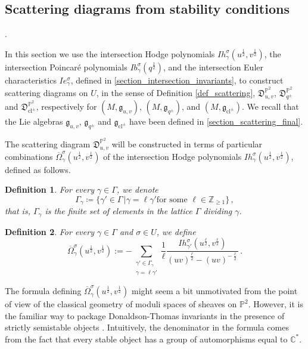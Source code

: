 \documentclass[12pt, a4paper]{amsart}
\newtheorem{defn}{Definition}[section]
\newcommand\C{\mathbb C}
\newcommand\PP{\mathbb P}
\newcommand\Z{\mathbb Z}
\newcommand\fD{\mathfrak D}
\newcommand\fg{\mathfrak g}
\newcommand\cl{\operatorname{cl}}
\begin{document}
\subsection{Scattering diagrams from stability conditions}.
\label{section_scattering_from_stability}

In this section we use the intersection Hodge polynomials 
$Ih_\gamma^\sigma(u^{\frac{1}{2}}, v^{\frac{1}{2}})$,
the intersection Poincar\'e polynomials $Ib_\gamma^\sigma(q^{\frac{1}{2}})$,
and the intersection Euler characteristics 
$Ie_\gamma^\sigma$, defined in  \cref{section_intersection_invariants},
to construct scattering diagrams on $U$, in the sense of 
Definition \ref{def_scattering}, $\fD^{\PP^2}_{u,v}$,
$\fD^{\PP^2}_{q^\pm}$ and $\fD^{\PP^2}_{\cl^\pm}$, respectively for
$(M,\fg_{u,v})$, $(M,\fg_{q^\pm})$, 
and
$(M, \fg_{\cl^{\pm}})$. We recall that the Lie algebras
$\fg_{u,v}$, $\fg_{q^\pm}$ and $\fg_{\cl^\pm}$ have been defined in
\cref{section_scattering_final}.

The scattering diagram  $\fD^{\PP^2}_{u,v}$ will be constructed in terms of particular combinations 
$\overline{\Omega}_\gamma^\sigma(u^{\frac{1}{2}}, v^{\frac{1}{2}})$ of the intersection Hodge polynomials $Ih_\gamma^\sigma(u^{\frac{1}{2}}, v^{\frac{1}{2}})$, defined as follows.


\begin{defn}
For every $\gamma \in \Gamma$,
we denote
\[ \Gamma_\gamma \coloneq \{\gamma' \in \Gamma\,|
\gamma=\ell \gamma' \text{for some }
\ell \in \Z_{\geqslant 1}\}\,,\]
that is, $\Gamma_\gamma$ is the finite set of elements in the lattice $\Gamma$
dividing $\gamma$.
\end{defn}

\begin{defn} \label{def_omega}
For every $\gamma \in \Gamma$ and $\sigma \in U$, we define
\[ \overline{\Omega}_\gamma^\sigma(u^{\frac{1}{2}}, v^{\frac{1}{2}}) :=-\sum_{\substack{\gamma' \in \Gamma_\gamma\\ \gamma=\ell \gamma'}}
\frac{1}{\ell}
\frac{Ih_{\gamma'}^\sigma(u^{\frac{\ell}{2}}, v^{\frac{\ell}{2}})}{
(uv)^{\frac{\ell}{2}}-(uv)^{-\frac{\ell}{2}}}\,. \]
\end{defn}

The formula defining $\overline{\Omega}_\gamma^\sigma(u^{\frac{1}{2}}, v^{\frac{1}{2}})$ might seem a bit unmotivated from the point of view of the classical geometry of moduli spaces of sheaves on $\PP^2$. However, it is the familiar way to package Donaldson-Thomas invariants in the presence of strictly semistable objects \cite{kontsevich2008stability, MR2951762}. Intuitively, the denominator in the formula comes from the fact that every stable object has a group of automorphisms equal to $\C^{*}$.
\end{document}
